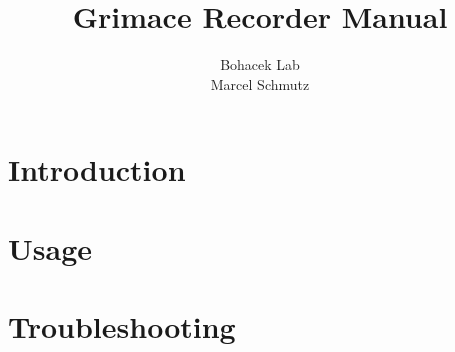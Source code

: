 \documentclass{ol-softwaremanual}
\title{Grimace Recorder Manual}
\author{Bohacek Lab\\Marcel Schmutz}
\begin{document}
\maketitle

\tableofcontents
\newpage

\section{Introduction}


\newpage

\section{Usage}



\section{Troubleshooting}


\end{document}
